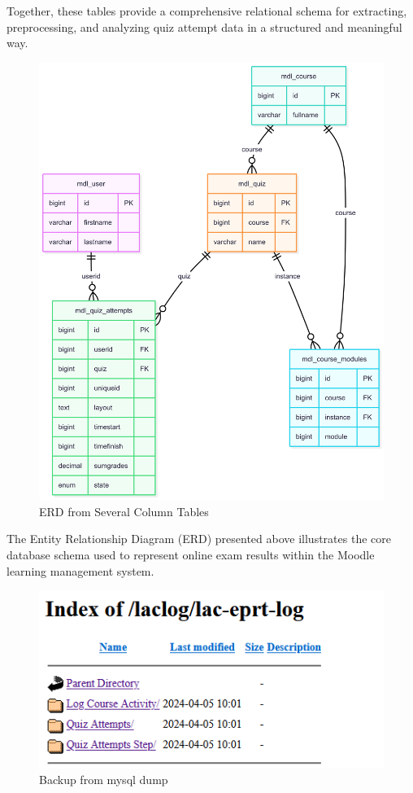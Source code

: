 Together, these tables provide a comprehensive relational schema for extracting, preprocessing, and analyzing quiz attempt data in a structured and meaningful way.
\begin{figure}[H] 
	\centering
	\includegraphics[width=14cm]{figure/erd-database-quiz-attempts.png}
	\caption{ERD from Several Column Tables}
	\label{fig:erd-tables}
\end{figure}
The Entity Relationship Diagram (ERD) presented above illustrates the core database schema used to represent online exam results within the Moodle learning management system.

\begin{figure}[H] 
	\centering
	\includegraphics[width=14cm]{figure/sandbox-log-eprt.png}
	\caption{Backup from mysql dump}
	\label{fig:sandbox-mysql-dump}
\end{figure}

